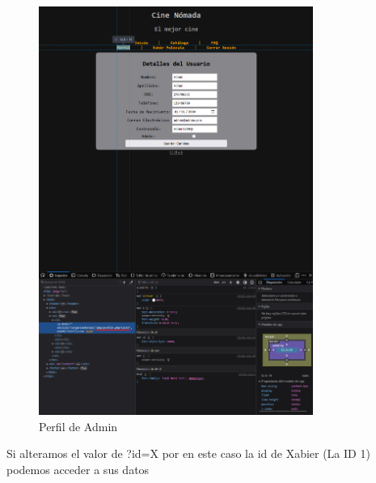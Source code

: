 \documentclass{report}
\begin{document}
                    \begin{figure}[H]
                        \centering
                        \includegraphics[width=0.8\textwidth]{./img/vulnerabilidades/3.1.1.2.png}
                        \caption{Perfil de Admin}
                    \end{figure}
                    Si alteramos el valor de ?id=X por en este caso la id de Xabier (La ID 1) podemos acceder a sus datos
\end{document}
